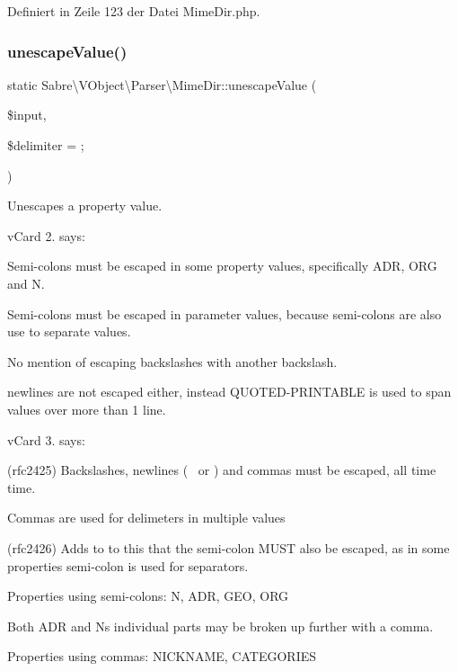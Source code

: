 Definiert in Zeile 123 der Datei Mime\+Dir.\+php.

\mbox{\label{class_sabre_1_1_v_object_1_1_parser_1_1_mime_dir_afa5cc25ac8ea445d6981d4cecde94449}} 
\subsubsection{\texorpdfstring{unescape\+Value()}{unescapeValue()}}
{\footnotesize\ttfamily static Sabre\textbackslash{}\+V\+Object\textbackslash{}\+Parser\textbackslash{}\+Mime\+Dir\+::unescape\+Value (\begin{DoxyParamCaption}\item[{}]{\$input,  }\item[{}]{\$delimiter = {\ttfamily \textquotesingle{};\textquotesingle{}} }\end{DoxyParamCaption})\hspace{0.3cm}{\ttfamily [static]}}

Unescapes a property value.

v\+Card 2. says\+:
\begin{DoxyItemize}
\item Semi-\/colons must be escaped in some property values, specifically A\+DR, O\+RG and N.
\item Semi-\/colons must be escaped in parameter values, because semi-\/colons are also use to separate values.
\item No mention of escaping backslashes with another backslash.
\item newlines are not escaped either, instead Q\+U\+O\+T\+E\+D-\/\+P\+R\+I\+N\+T\+A\+B\+LE is used to span values over more than 1 line.
\end{DoxyItemize}

v\+Card 3. says\+:
\begin{DoxyItemize}
\item (rfc2425) Backslashes, newlines (~\newline
 or ) and comma\textquotesingle{}s must be escaped, all time time.
\item Comma\textquotesingle{}s are used for delimeters in multiple values
\item (rfc2426) Adds to to this that the semi-\/colon M\+U\+ST also be escaped, as in some properties semi-\/colon is used for separators.
\item Properties using semi-\/colons\+: N, A\+DR, G\+EO, O\+RG
\item Both A\+DR and N\textquotesingle{}s individual parts may be broken up further with a comma.
\item Properties using commas\+: N\+I\+C\+K\+N\+A\+ME, C\+A\+T\+E\+G\+O\+R\+I\+ES
\end{DoxyItemize}


